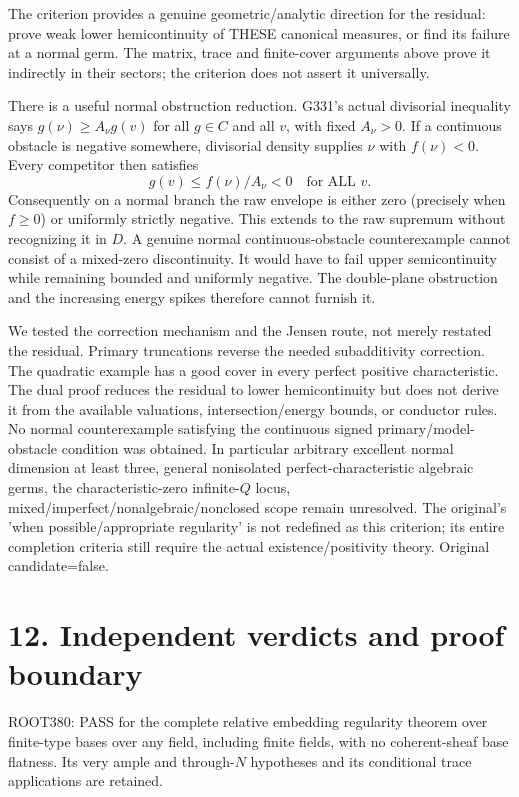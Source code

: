 \documentclass[11pt]{article}
\begin{document}
The criterion provides a genuine geometric/analytic direction for the residual: prove weak lower hemicontinuity of THESE canonical measures, or find its failure at a normal germ. The matrix, trace and finite-cover arguments above prove it indirectly in their sectors; the criterion does not assert it universally.

There is a useful normal obstruction reduction. G331's actual divisorial inequality says \(g(\nu)\ge A_\nu g(v)\) for all \(g\in C\) and all \(v\), with fixed \(A_\nu>0\). If a continuous obstacle is negative somewhere, divisorial density supplies \(\nu\) with \(f(\nu)<0\). Every competitor then satisfies
\[
g(v)\le f(\nu)/A_\nu<0\quad\text{for ALL }v.
\]
Consequently on a normal branch the raw envelope is either zero (precisely when \(f\ge0\)) or uniformly strictly negative. This extends to the raw supremum without recognizing it in \(D\). A genuine normal continuous-obstacle counterexample cannot consist of a mixed-zero discontinuity. It would have to fail upper semicontinuity while remaining bounded and uniformly negative. The double-plane obstruction and the increasing energy spikes therefore cannot furnish it.

We tested the correction mechanism and the Jensen route, not merely restated the residual. Primary truncations reverse the needed subadditivity correction. The quadratic example has a good cover in every perfect positive characteristic. The dual proof reduces the residual to lower hemicontinuity but does not derive it from the available valuations, intersection/energy bounds, or conductor rules. No normal counterexample satisfying the continuous signed primary/model-obstacle condition was obtained. In particular arbitrary excellent normal dimension at least three, general nonisolated perfect-characteristic algebraic germs, the characteristic-zero infinite-\(Q\) locus, mixed/imperfect/nonalgebraic/nonclosed scope remain unresolved. The original's 'when possible/appropriate regularity' is not redefined as this criterion; its entire completion criteria still require the actual existence/positivity theory. Original candidate=false.

\section{12. Independent verdicts and proof boundary}

ROOT380: PASS for the complete relative embedding regularity theorem over finite-type bases over any field, including finite fields, with no coherent-sheaf base flatness. Its very ample and through-\(N\) hypotheses and its conditional trace applications are retained.
\end{document}
